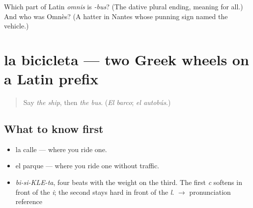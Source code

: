\begin{tcolorbox}[breakable,colback=teal!4,colframe=teal!35!black,title={Before you move on}]
Which part of Latin \emph{omnis} is \emph{-bus}? (The dative plural ending, meaning for all.) And who was Omnès? (A hatter in Nantes whose punning sign named the vehicle.)
\end{tcolorbox}
\section[la bicicleta]{la bicicleta — two Greek wheels on a Latin prefix}

\label{lesson:ES-C363-bicicleta}



\begin{quote}
Say \emph{the ship}, then \emph{the bus}. (\emph{El barco}; \emph{el autobús}.)
\end{quote}

\subsection*{What to know first}
\begin{itemize}
\raggedright
  \item la calle — where you ride one.
  \item el parque — where you ride one without traffic.
\end{itemize}

\begin{sounds}
\begin{itemize}
\raggedright
  \item \emph{bi-si-KLE-ta}, four beats with the weight on the third. The first \emph{c} softens in front of the \emph{i}; the second stays hard in front of the \emph{l}. $\to$ pronunciation reference
\end{itemize}
\end{sounds}

